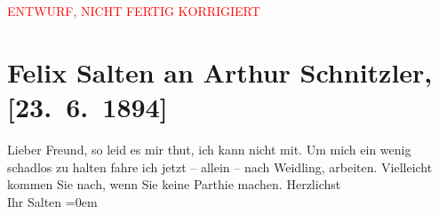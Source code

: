 
\begin{center}
            \textcolor{red}{ENTWURF, NICHT FERTIG KORRIGIERT}
                      \end{center}
            
         \renewcommand{\erwaehnteOrte}{Orte: Weidling, Wien}
         \renewcommand{\erwaehnteWerke}{}
               \section[Felix Salten an Arthur Schnitzler, {[}23. 6. 1894{]}]{ Felix Salten an Arthur Schnitzler, {[}23. 6. 1894{]}}\nopagebreak{}\rehead{ }\begin{ledgroupsized}[t]{13cm}\normalsize\beginnumbering \toendnotes[C]{\smallbreak\pagebreak[2]} 
\pstart
           \noindent{}{\pb}Lieber Freund, so leid es mir thut, ich kann nicht mit. Um mich ein
               wenig schadlos zu halten fahre ich jetzt – allein – nach Weidling, arbeiten. Vielleicht kommen Sie nach, wenn Sie {\pb}keine Parthie machen. \pend
           \pstart
           Herzlichst {\\[\baselineskip]}Ihr \spacefill\mbox{Salten}\pend
           \leftskip=0em{}
         
         \endnumbering{}\end{ledgroupsized}\begin{anhang}\end{anhang}\newcommand{\dateiname}{L03137}\newcommand{\titel}{Felix Salten an Arthur Schnitzler, [23. 6. 1894]}\newcommand{\editorInnen}{Martin Anton Müller und Laura Untner}
      